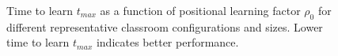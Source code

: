 \begin{figure}[htbp!]
    \caption{Time to learn $t_{max}$ as a function of positional learning factor $\rho_0$ for different representative classroom configurations and sizes. Lower time to learn $t_{max}$ indicates better performance.}
    \label{fig:2DBPCAIH t-rho plot}
 \end{figure}

